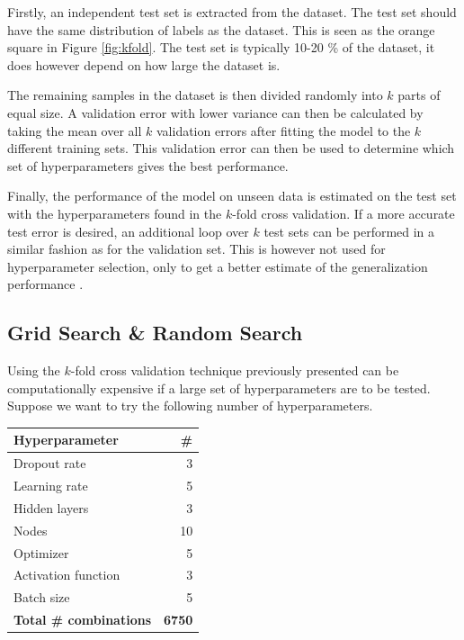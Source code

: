 Firstly, an independent test set is extracted from the dataset. The test set should have the same distribution of labels as the dataset. This is seen as the orange square in Figure \ref{fig:kfold}. The test set is typically 10-20 \% of the dataset, it does however depend on how large the dataset is.

The remaining samples in the dataset is then divided randomly into $k$ parts of equal size. A validation error with lower variance can then be calculated by taking the mean over all $k$ validation errors after fitting the model to the $k$ different training sets. This validation error can then be used to determine which set of hyperparameters gives the best performance. 

Finally, the performance of the model on unseen data is estimated on the test set with the hyperparameters found in the $k$-fold cross validation. If a more accurate test error is desired, an additional loop over $k$ test sets can be performed in a similar fashion as for the validation set. This is however not used for hyperparameter selection, only to get a better estimate of the generalization performance \citep{Goodfellow-et-al-2016}. 

\subsection{Grid Search \& Random Search}

Using the $k$-fold cross validation technique previously presented can be computationally expensive if a large set of hyperparameters are to be tested. Suppose we want to try the following number of hyperparameters.

\begin{table}[H]
    \centering
    \begin{tabular}{lr}
    \hline
        \textbf{Hyperparameter} & \textbf{\#} \\
        \hline \hline 
         Dropout rate & 3 \\
         Learning rate & 5 \\
         Hidden layers & 3 \\
         Nodes & 10 \\
         Optimizer & 5 \\
         Activation function & 3 \\
         Batch size & 5 \\
         \hline \hline 
         \textbf{Total \# combinations } & \textbf{6750}
    \end{tabular}
\end{table}

